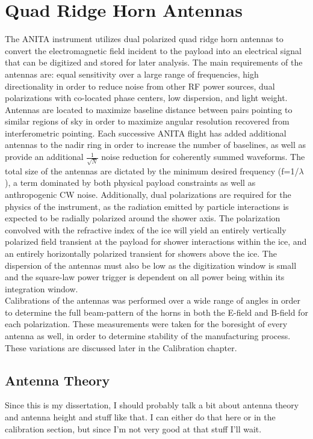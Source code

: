 \section{Quad Ridge Horn Antennas}
	The ANITA instrument utilizes dual polarized quad ridge horn antennas to convert the electromagnetic field incident to the payload into an electrical signal that can be digitized and stored for later analysis.  The main requirements of the antennas are: equal sensitivity over a large range of frequencies, high directionality in order to reduce noise from other RF power sources, dual polarizations with co-located phase centers, low dispersion, and light weight.  \\
	Antennas are located to maximize baseline distance between pairs pointing to similar regions of sky in order to maximize angular resolution recovered from interferometric pointing.  Each successive ANITA flight has added additional antennas to the nadir ring in order to increase the number of baselines, as well as provide an additional $\frac{1}{\sqrt{N}}$ noise reduction for coherently summed waveforms.  The total size of the antennas are dictated by the minimum desired frequency (f=1/$\lambda$), a term dominated by both physical payload constraints as well as anthropogenic CW noise.  Additionally, dual polarizations are required for the physics of the instrument, as the radiation emitted by particle interactions is expected to be radially polarized around the shower axis.  The polarization convolved with the refractive index of the ice will yield an entirely vertically polarized field transient at the payload for shower interactions within the ice, and an entirely horizontally polarized transient for showers above the ice.  The dispersion of the antennas must also be low as the digitization window is small and the square-law power trigger is dependent on all power being within its integration window. \\
	Calibrations of the antennas was performed over a wide range of angles in order to determine the full beam-pattern of the horns in both the E-field and B-field for each polarization.  These measurements were taken for the boresight of every antenna as well, in order to determine stability of the manufacturing process.  These variations are discussed later in the Calibration chapter.
	\subsection{Antenna Theory}
		Since this is my dissertation, I should probably talk a bit about antenna theory and antenna height and stuff like that.  I can either do that here or in the calibration section, but since I'm not very good at that stuff I'll wait.
	
